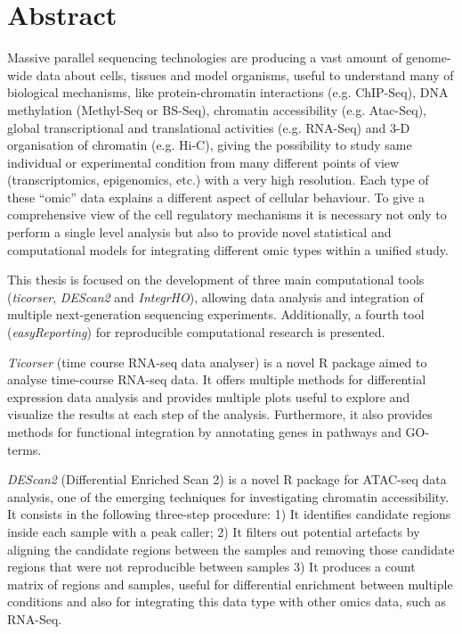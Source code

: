 \section*{Abstract}
{\setlength{\parindent}{0cm}
Massive parallel sequencing technologies are producing a vast amount of genome-wide data about cells, tissues and model organisms, useful to understand many of biological mechanisms, like protein-chromatin interactions (e.g. ChIP-Seq), DNA methylation (Methyl-Seq or BS-Seq), chromatin accessibility (e.g. Atac-Seq), global transcriptional and translational activities (e.g. RNA-Seq) and 3-D organisation of chromatin (e.g. Hi-C), giving the possibility to study same individual or experimental condition from many different points of view (transcriptomics, epigenomics, etc.) with a very high resolution. Each type of these “omic” data explains a different aspect of cellular behaviour. To give a comprehensive view of the cell regulatory mechanisms it is necessary not only to perform a single level analysis but also to provide novel statistical and computational models for integrating different omic types within a unified study.

This thesis is focused on the development of three main computational tools (\textit{ticorser}, \textit{DEScan2} and \textit{IntegrHO}), allowing data analysis and integration of multiple next-generation sequencing experiments.
Additionally, a fourth tool (\textit{easyReporting}) for reproducible computational research is presented.

\textit{Ticorser} (time course RNA-seq data analyser) is a novel R package aimed to analyse time-course RNA-seq data. It offers multiple methods for differential expression data analysis and provides multiple plots useful to explore and visualize the results at each step of the analysis. Furthermore, it also provides methods for functional integration by annotating genes in pathways and GO-terms.

\textit{DEScan2} (Differential Enriched Scan 2) is a novel R package for ATAC-seq data analysis, one of the emerging techniques for investigating chromatin accessibility. It consists in the following three-step procedure: 1) It identifies candidate regions inside each sample with a peak caller; 2) It filters out potential artefacts by aligning the candidate regions between the samples and removing those candidate regions that were not reproducible between samples 3) It produces a count matrix of regions and samples, useful for differential enrichment between multiple conditions and also for integrating this data type with other omics data, such as RNA-Seq.

}
